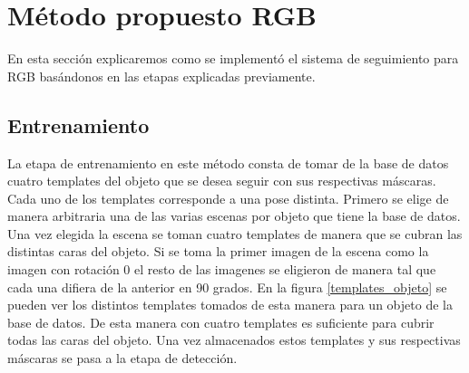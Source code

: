 \section{Método propuesto RGB}\label{metodo_rgb}
En esta sección explicaremos como se implementó el sistema de seguimiento para RGB basándonos en las etapas explicadas previamente. 

\subsection{Entrenamiento}
La etapa de entrenamiento en este método consta de tomar de la base de datos cuatro templates del objeto que se desea seguir con sus respectivas máscaras. Cada uno de los templates corresponde a una pose distinta. Primero se elige de manera arbitraria una de las varias escenas por objeto que tiene la base de datos. Una vez elegida la escena se toman cuatro templates de manera que se cubran las distintas caras del objeto. Si se toma la primer imagen de la escena como la imagen con rotación 0 el resto de las imagenes se eligieron de manera tal que cada una difiera de la anterior en 90 grados. En la figura \ref{templates_objeto} se pueden ver los distintos templates tomados de esta manera para un objeto de la base de datos. De esta manera con cuatro templates es suficiente para cubrir todas las caras del objeto. Una vez almacenados estos templates y sus respectivas máscaras se pasa a la etapa de detección.

